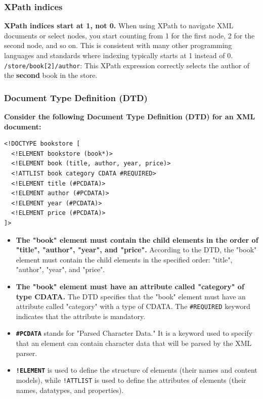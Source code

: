 \subsubsection{XPath indices}
\textbf{XPath indices start at 1, not 0.} When using XPath to navigate XML documents or select nodes, you start counting from 1 for the first node, 2 for the second node, and so on. This is consistent with many other programming languages and standards where indexing typically starts at 1 instead of 0.\\

\texttt{/store/book[2]/author}: This XPath expression correctly selects the author of the \textbf{second} book in the store.

\subsubsection{Document Type Definition (DTD)}
\textbf{Consider the following Document Type Definition (DTD) for an XML document:}
\begin{verbatim}
<!DOCTYPE bookstore [
  <!ELEMENT bookstore (book*)>
  <!ELEMENT book (title, author, year, price)>
  <!ATTLIST book category CDATA #REQUIRED>
  <!ELEMENT title (#PCDATA)>
  <!ELEMENT author (#PCDATA)>
  <!ELEMENT year (#PCDATA)>
  <!ELEMENT price (#PCDATA)>
]>
\end{verbatim}

\begin{itemize}
\item \textbf{The "book" element must contain the child elements in the order of "title", "author", "year", and "price".} According to the DTD, the "book" element must contain the child elements in the specified order: "title", "author", "year", and "price".

\item \textbf{The "book" element must have an attribute called "category" of type CDATA.} The DTD specifies that the "book" element must have an attribute called "category" with a type of CDATA. The \texttt{\#REQUIRED} keyword indicates that the attribute is mandatory.

\item \textbf{\texttt{\#PCDATA}} stands for "Parsed Character Data." It is a keyword used to specify that an element can contain character data that will be parsed by the XML parser.\\

\item \textbf{\texttt{!ELEMENT}} is used to define the structure of elements (their names and content models), while \texttt{!ATTLIST} is used to define the attributes of elements (their names, datatypes, and properties).
\end{itemize}

